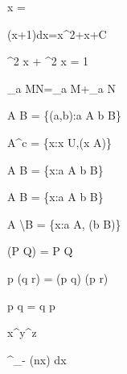 x = 

\int (x+1)dx=x^2+x+C


\sin^2 x + \cos^2 x = 1

\log_a  MN=\log_a M+\log_a N

A \times B = \{(a,b):a \in A \wedge b \in B\}

A^c = \{x:x \in U,\neg (x \in A)\}

A \cup B = \{x:a \in A \vee b \in B\}

A \cap B = \{x:a \in A \wedge b \in B\}

A \backslash B = \{x:a \in A, \neg(b \in B)\}

\neg (P \vee Q) = \neg P \wedge \neg Q

p \vee (q \wedge r) = (p \vee q) \wedge (p \vee r)

p \vee q = q \vee p

x^{y^{z}}

\int^{}_{- } \sin(nx) dx